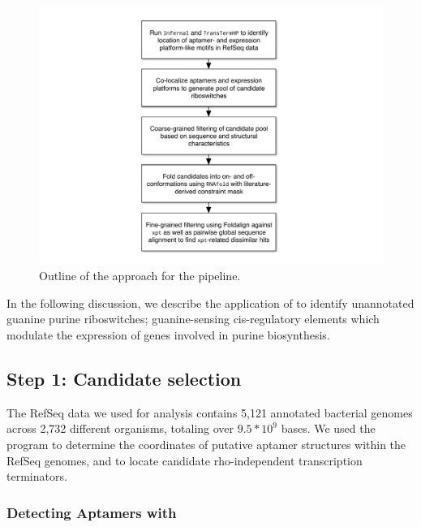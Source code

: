 \begin{figure}[!ht]
\centering
\includegraphics[width=.9\textwidth]{Figures/Ribofinder/ribofinderOverview.pdf}
\caption{Outline of the approach for the \rfinder pipeline.}
\label{fig:rfinder:flowchart}
\end{figure}

In the following discussion, we describe the application of \rfinder to identify unannotated guanine purine riboswitches; guanine-sensing cis-regulatory elements which modulate the expression of genes involved in purine biosynthesis.

\subsection{Step 1: Candidate selection}
\label{subsec:rfinder:selection}

The RefSeq data we used for analysis contains 5,121 annotated bacterial genomes across 2,732 different organisms, totaling over $9.5 * 10^9$ bases. We used the program \infernal to determine the coordinates of putative aptamer structures within the RefSeq genomes, and \tthp to locate candidate rho-independent transcription terminators.

\subsubsection{Detecting Aptamers with \infernal}
\label{subsubsec:rfinder:infernal}

